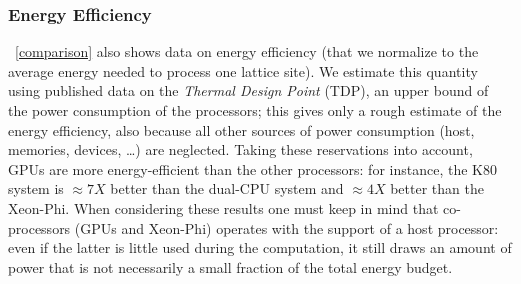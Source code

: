 \documentclass{elsarticle}
\begin{document}
\subsubsection*{Energy Efficiency}

\tablename~\ref{comparison} also shows data on energy efficiency 
(that we normalize to the average energy needed to process one lattice site). We estimate this quantity using
published data on the {\em Thermal Design Point} (TDP), an upper bound of the 
power consumption of the processors; this gives only a rough estimate of the 
energy efficiency, also because all other sources of power consumption (host, memories, devices, \ldots) are neglected. 
%
Taking these reservations into account, GPUs are more energy-efficient than the other
processors: for instance, the K80 system is $\approx 7X$ better than the
dual-CPU system and $\approx 4X$ better than the Xeon-Phi. When considering 
these results one must keep in mind that co-processors (GPUs and Xeon-Phi) 
operates with the support of a host processor: even if the latter is little 
used during the computation, it still draws an amount of power that is not 
necessarily a small fraction of the total energy budget.
\end{document}
